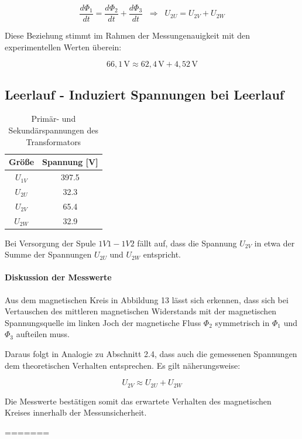 \documentclass{article}
\begin{document}
\[
\frac{d\Phi_1}{dt} = \frac{d\Phi_2}{dt} + \frac{d\Phi_3}{dt}
\;\;\Rightarrow\;\;
U_{2U} = U_{2V} + U_{2W}
\]

Diese Beziehung stimmt im Rahmen der Messungenauigkeit mit den experimentellen Werten überein:



\[
66{,}1\,\text{V} \approx 62{,}4\,\text{V} + 4{,}52\,\text{V}
\]
	
\subsection{Leerlauf - Induziert Spannungen bei Leerlauf}

\begin{table}[h]
	\centering
	\begin{tabular}{|c|c|}
		\hline
		Größe & Spannung [V] \\
		\hline
		$U_{1V}$   & 397.5 \\
		$U_{2U}$ & 32.3 \\
		$U_{2V}$ & 65.4 \\
		$U_{2W}$ & 32.9 \\
		\hline
	\end{tabular}
	\caption{Primär- und Sekundärspannungen des Transformators}
\end{table}

Bei Versorgung der Spule \(1V1 - 1V2\) fällt auf, dass die Spannung \(U_{2V}\) in etwa der Summe der Spannungen \(U_{2U}\) und \(U_{2W}\) entspricht.

\paragraph{Diskussion der Messwerte}

Aus dem magnetischen Kreis in Abbildung 13 lässt sich erkennen, dass sich bei Vertauschen des mittleren magnetischen Widerstands mit der magnetischen Spannungsquelle im linken Joch der magnetische Fluss \(\Phi_2\) symmetrisch in \(\Phi_1\) und \(\Phi_3\) aufteilen muss.

Daraus folgt in Analogie zu Abschnitt 2.4, dass auch die gemessenen Spannungen dem theoretischen Verhalten entsprechen. Es gilt näherungsweise:

\[
U_{2V} \approx U_{2U} + U_{2W}
\]

Die Messwerte bestätigen somit das erwartete Verhalten des magnetischen Kreises innerhalb der Messunsicherheit.

	
=======
	
\end{document}
